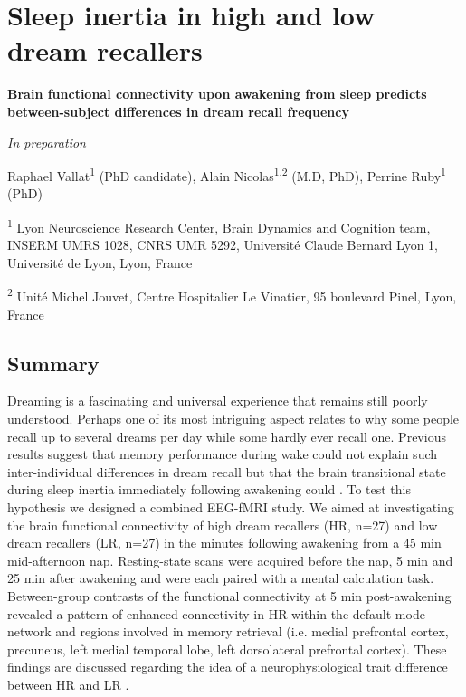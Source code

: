 \section{Sleep inertia in high and low dream recallers}
\label{res:inertia:drf}

\bigskip

\textbf{{\large Brain functional connectivity upon awakening from sleep predicts between-subject differences in dream recall frequency}}

\hfill \emph{In preparation}

\bigskip

Raphael Vallat\textsuperscript{1} (PhD candidate), Alain Nicolas\textsuperscript{1,2} (M.D, PhD), Perrine Ruby\textsuperscript{1} (PhD)

\textsuperscript{1} Lyon Neuroscience Research Center, Brain Dynamics and Cognition team, INSERM UMRS 1028, CNRS UMR 5292, Université Claude Bernard Lyon 1, Université de Lyon, Lyon, France

\textsuperscript{2} Unité Michel Jouvet, Centre Hospitalier Le Vinatier, 95 boulevard Pinel, Lyon, France

\subsection*{Summary}
\label{res:inertia:drf:summary}

Dreaming is a fascinating and universal experience that remains still poorly understood. Perhaps one of its most intriguing aspect relates to why some people recall up to several dreams per day while some hardly ever recall one. Previous results suggest that memory performance during wake could not explain such inter-individual differences in dream recall but that the brain transitional state during sleep inertia immediately following awakening could . To test this hypothesis we designed a combined EEG-fMRI study. We aimed at investigating the brain functional connectivity of high dream recallers (HR, n=27) and low dream recallers (LR, n=27) in the minutes following awakening from a 45 min mid-afternoon nap. Resting-state scans were acquired before the nap, 5 min and 25 min after awakening and were each paired with a mental calculation task. Between-group contrasts of the functional connectivity at 5 min post-awakening revealed a pattern of enhanced connectivity in HR within the default mode network and regions involved in memory retrieval (i.e. medial prefrontal cortex, precuneus, left medial temporal lobe, left dorsolateral prefrontal cortex). These findings are discussed regarding the idea of a neurophysiological trait difference between HR and LR .


